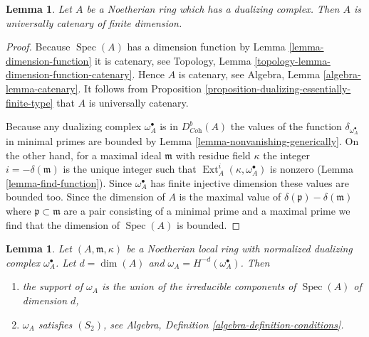 \documentclass{stacks-project}
\theoremstyle{plain}
\newtheorem{lemma}[subsection]{Lemma}
\theoremstyle{definition}
\theoremstyle{remark}
\numberwithin{equation}{subsection}
\def\Spec{\mathop{\mathrm{Spec}}}
\def\Ext{\mathop{\mathrm{Ext}}\nolimits}
\begin{document}
\begin{lemma}
\label{lemma-universally-catenary}
Let $A$ be a Noetherian ring which has a dualizing
complex. Then $A$ is universally catenary of finite dimension.
\end{lemma}

\begin{proof}
Because $\Spec(A)$ has a dimension function by
Lemma \ref{lemma-dimension-function}
it is catenary, see
Topology, Lemma \ref{topology-lemma-dimension-function-catenary}.
Hence $A$ is catenary, see
Algebra, Lemma \ref{algebra-lemma-catenary}.
It follows from
Proposition \ref{proposition-dualizing-essentially-finite-type}
that $A$ is universally catenary.

\medskip\noindent
Because any dualizing complex $\omega_A^\bullet$ is
in $D^b_{\textit{Coh}}(A)$ the values of the function
$\delta_{\omega_A^\bullet}$ in minimal primes are bounded by
Lemma \ref{lemma-nonvanishing-generically}.
On the other hand, for a maximal ideal $\mathfrak m$ with
residue field $\kappa$ the integer $i = -\delta(\mathfrak m)$
is the unique integer such that
$\Ext_A^i(\kappa, \omega_A^\bullet)$ is nonzero
(Lemma \ref{lemma-find-function}).
Since $\omega_A^\bullet$ has finite injective dimension
these values are bounded too. Since the dimension of
$A$ is the maximal value of $\delta(\mathfrak p) - \delta(\mathfrak m)$
where $\mathfrak p \subset \mathfrak m$ are a pair
consisting of a minimal prime and a maximal prime we find that the
dimension of $\Spec(A)$ is bounded.
\end{proof}

\begin{lemma}
\label{lemma-depth-dualizing-module}
Let $(A, \mathfrak m, \kappa)$ be a Noetherian local ring with
normalized dualizing complex $\omega_A^\bullet$. Let $d = \dim(A)$
and $\omega_A = H^{-d}(\omega_A^\bullet)$. Then
\begin{enumerate}
\item the support of $\omega_A$ is the union of the irreducible components
of $\Spec(A)$ of dimension $d$,
\item $\omega_A$ satisfies $(S_2)$, see
Algebra, Definition \ref{algebra-definition-conditions}.
\end{enumerate}
\end{lemma}
\end{document}
